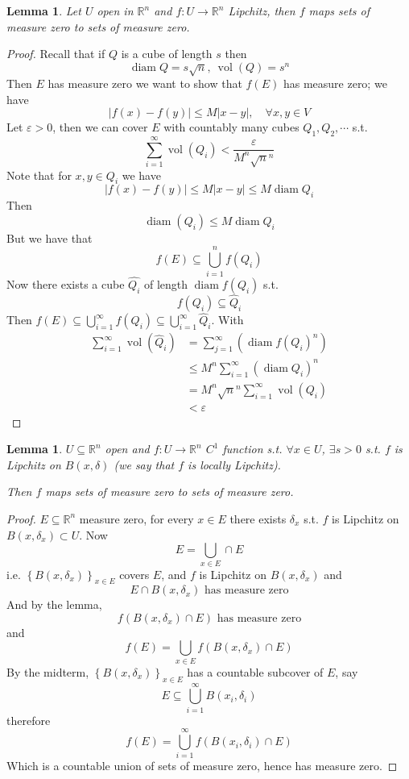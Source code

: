\documentclass[11pt,a4paper]{article}
\theoremstyle{definition}
\theoremstyle{plain}
\newtheorem{lemma}[definition]{Lemma}
\theoremstyle{remark}
\newcommand{\R}{\mathbb{R}}
\renewcommand{\set}[1]{\left\{ #1 \right\}}
\newcommand{\abs}[1]{\lvert #1 \rvert}
\newcommand{\vol}{\operatorname{vol}}
\begin{document}
\begin{lemma}
    Let $U$ open in $\R^n$ and $f \colon U \to \R^n$ Lipchitz, then $f$ maps sets of measure zero to sets of 
    measure zero.  
\end{lemma}

\begin{proof}
    Recall that if $Q$ is a cube of length $s$ then 
    $$\operatorname{diam} Q = s \sqrt{n}, \ \vol (Q) = s^n$$
    Then $E$ has measure zero we want to show that $f(E)$ has measure zero; we have 
    $$\abs{f(x)-f(y)} \le M \abs{x-y}, \quad \forall x, y \in V$$
    Let $\varepsilon > 0$, then we can cover $E$ with countably many cubes $Q_1, Q_2, \cdots$ s.t. 
    $$\sum_{i=1}^\infty \vol (Q_i) < \frac{\varepsilon}{M^n \sqrt{n}^n}$$
    Note that for $x,y \in Q_i$ we have 
    $$\abs{f(x) - f(y)} \le M \abs{x-y} \le M \operatorname{diam} Q_i$$
    Then 
    $$\operatorname{diam} (Q_i) \le M \operatorname{diam} Q_i$$
    But we have that 
    $$f(E) \subseteq \bigcup_{i=1}^n f(Q_i)$$
    Now there exists a cube $\hat{Q_i}$ of length $\operatorname{diam} f(Q_i)$ s.t. 
    $$f(Q_i) \subseteq \hat{Q}_i$$
    Then $f(E) \subseteq \bigcup_{i=1}^\infty f(Q_i) \subseteq \bigcup_{i=1}^\infty \hat{Q}_i$. 
    With 
    \begin{align*}
        \sum_{i=1}^\infty \vol (\hat{Q}_i) &= \sum_{j=1}^\infty \left(\operatorname{diam} f(Q_i)^n\right) \\
        &\le M^n \sum_{i=1}^\infty (\operatorname{diam} Q_i)^n \\
        &= M^n \sqrt{n}^n \sum_{i=1}^\infty \vol(Q_i) \\
        &< \varepsilon
    \end{align*}
\end{proof}

\begin{lemma}
    $U \subseteq \R^n$ open and $f \colon U \to \R^n$ $C^1$ function s.t. $\forall x \in U$, $\exists s > 0$ s.t. 
    $f$ is Lipchitz on $B(x, \delta)$ (we say that $f$ is locally Lipchitz).

    Then $f$ maps sets of measure zero to sets of measure zero. 
\end{lemma}

\begin{proof}
    $E \subseteq \R^n$ measure zero, for every $x \in E$ there exists $\delta_x$ s.t. 
    $f$ is Lipchitz on $B(x, \delta_x) \subset U$. Now 
    $$E = \bigcup_{x \in E} \cap E$$
    i.e. $\set{B(x,\delta_x)}_{x \in E}$ covers $E$, and $f$ is Lipchitz on $B(x, \delta_x)$ and 
    $$E \cap B(x, \delta_x) \text{ has measure zero}$$
    And by the lemma, 
    $$f(B(x,\delta_x) \cap E) \text{ has measure zero}$$
    and 
    $$f(E) = \bigcup_{x \in E} f\left(B(x, \delta_x) \cap E\right)$$
    By the midterm, $\set{B(x, \delta_x)}_{x \in E}$ has a countable subcover of $E$, say 
    $$E \subseteq  \bigcup_{i=1}^\infty B(x_i, \delta_i)$$
    therefore 
    $$f(E) = \bigcup_{i=1}^\infty f\left(B(x_i, \delta_i) \cap E\right)$$
    Which is a countable union of sets of measure zero, hence has measure zero. 
\end{proof}
\end{document}
